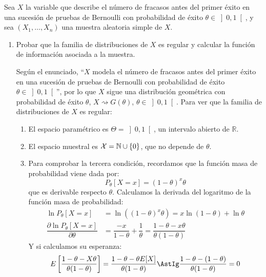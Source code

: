 \begin{ejercicio}
    Sea $X$ la variable que describe el número de fracasos antes del primer éxito en una sucesión de pruebas de Bernoulli con probabilidad de éxito $\theta\in \left]0,1\right[$, y sea $(X_1, \ldots, X_n)$ una muestra aleatoria simple de $X$.
    \begin{enumerate}
        \item Probar que la familia de distribuciones de $X$ es regular y calcular la función de información asociada a la muestra.

            Según el enunciado, ``$X$ modela el número de fracasos antes del primer éxito en una sucesión de pruebas de Bernoulli con probabilidad de éxito $\theta\in \left]0,1\right[$'', por lo que $X$ sigue una distribución geométrica con probabilidad de éxito $\theta$, $X\rightsquigarrow G(\theta)$, $\theta \in \left]0,1\right[$. Para ver que la familia de distribuciones de $X$ es regular:
            \begin{enumerate}
                \item El espacio paramétrico es $\Theta = \left]0,1\right[$, un intervalo abierto de $\mathbb{R}$.
                \item El espacio muestral es $\mathcal{X}=\mathbb{N}\cup \{0\}$, que no depende de $\theta$.
                \item Para comprobar la tercera condición, recordamos que la función masa de probabilidad viene dada por:
                    \begin{equation*}
                        P_\theta[X=x] = {(1-\theta)}^{x}\theta
                    \end{equation*}
                    que es derivable respecto $\theta$. Calculamos la derivada del logaritmo de la función masa de probabilidad:
                    \begin{align*}
                        \ln P_\theta[X=x] &= \ln\left({(1-\theta)}^{x}\theta\right) = x\ln(1-\theta) + \ln\theta \\
                        \dfrac{\partial \ln P_\theta[X=x]}{\partial \theta} &= \dfrac{-x}{1-\theta} + \dfrac{1}{\theta} = \dfrac{1-\theta - x\theta}{\theta(1-\theta)} 
                    \end{align*}
                    Y si calculamos su esperanza:
                    \begin{equation*} 
                        E\left[\dfrac{1-\theta - X\theta}{\theta(1-\theta)} \right] = \dfrac{1-\theta - \theta E[X]}{\theta(1-\theta)} \AstIg \dfrac{1-\theta - (1-\theta)}{\theta(1-\theta)} = 0

\end{equation*}
\end{enumerate}
\end{enumerate}
\end{ejercicio}

